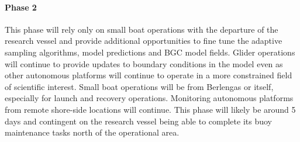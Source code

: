 

 

\paragraph{Phase 2} This phase will rely only on small boat operations
with the departure of the research vessel and provide additional
opportunities to fine tune the adaptive sampling algorithms, model
predictions and BGC model fields. Glider operations will continue to
provide updates to boundary conditions in the model even as other
autonomous platforms will continue to operate in a more constrained
field of scientific interest. Small boat operations will be from
Berlengas or \naz itself, especially for launch and recovery operations.
Monitoring autonomous platforms from remote shore-side locations will
continue. This phase will likely be around 5 days and contingent on the
research vessel being able to complete its buoy maintenance tasks north
of the \naz operational area.

